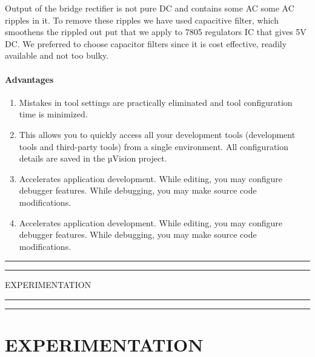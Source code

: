 \documentclass[12pt,a4paper,oneside,openright]{report}
\begin{document}
Output of the bridge rectifier is not pure DC and contains some AC some AC ripples in it. To remove these ripples we have used capacitive filter, which smoothens the rippled out put that we apply to 7805 regulators IC that gives 5V DC. We preferred to choose capacitor filters since it is cost effective, readily available and not too bulky.

\subsubsection{Advantages}
\begin{enumerate}
 \item Mistakes in tool settings are practically eliminated and tool configuration time is minimized.
\item This allows you to quickly access all your development tools (development tools and third-party tools) from a single environment. All configuration details are saved in the µVision project.
\item Accelerates application development. While editing, you may configure debugger features. While debugging, you may make source code modifications.
\item Accelerates application development. While editing, you may configure debugger features. While debugging, you may make source code modifications.
\end{enumerate}








\newpage
\vspace*{\fill}
 \begin{center}
\hrule%
\vspace{1pt}%
\hrule
\vspace{1pc}%
\LARGE\MakeUppercase{EXPERIMENTATION} 
\vspace{1pc}%
\hrule%
\vspace{1pt}%
\hrule
 \end{center}
 \vspace*{\fill}

\chapter{EXPERIMENTATION}
\end{document}
